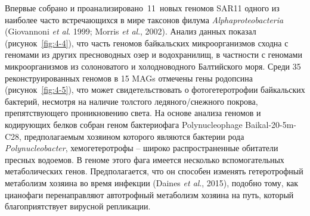\documentclass[a4paper,12pt,openany,final]{extreport}
\begin{document}
Впервые собрано и проанализировано~11~новых геномов SAR11 одного из наиболее часто встречающихся в мире таксонов филума \emph{Alphaproteobacteria} (Giovannoni \textit{et al}. 1999; Morris \textit{et al}., 2002). Анализ данных показал (рисунок~\ref{fig:4-4}), что часть геномов байкальских микроорганизмов сходна с геномами из других пресноводных озер и водохранилищ, в частности с геномами микроорганизмов из солоноватого и холодноводного Балтийского моря. Среди 35 реконструированных геномов в 15 MAGs отмечены гены родопсина (рисунок~\ref{fig:4-5}), что может свидетельствовать о фотогетеротрофии байкальских бактерий, несмотря на наличие толстого ледяного/снежного покрова, препятствующего проникновению света. На основе анализа геномов и кодирующих белков собран геном бактериофага Polynucleophage Baikal-20-5m-C28, предполагаемым хозяином которого являются бактерии рода \emph{Polynucleobacter}, хемогетеротрофы -- широко распространенные обитатели пресных водоемов. В геноме этого фага имеется несколько вспомогательных метаболических генов. Предполагается, что он способен изменять гетеротрофный метаболизм хозяина во время инфекции (Daines \textit{et al}., 2015), подобно тому, как цианофаги перенаправляют автотрофный метаболизм хозяина на путь, который благоприятствует вирусной репликации.
\end{document}
